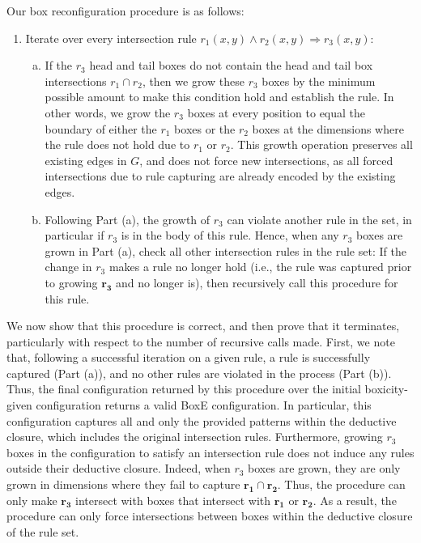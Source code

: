 \documentclass{article}
\begin{document}
Our box reconfiguration procedure is as follows:
\begin{enumerate}
    \item Iterate over every intersection rule $r_1(x,y) \land r_2(x,y) \Rightarrow r_3(x,y)$:
    \begin{enumerate}[(a)]
    \item If the $r_3$ head and tail boxes do not contain the head and tail box intersections $r_1 \cap r_2$, then we grow these $r_3$ boxes by the minimum possible amount to make this condition hold and establish the rule. In other words, we grow the $r_3$ boxes at every position to equal the boundary of either the $r_1$ boxes or the $r_2$ boxes at the dimensions where the rule does not hold due to $r_1$ or $r_2$. This growth operation preserves all existing edges in $G$, and does not force new intersections, as all forced intersections due to rule capturing are already encoded by the existing edges.
    
    \item Following Part (a), the growth of $r_3$ can violate another rule in the set, in particular if $r_3$ is in the body of this rule. Hence, when any $r_3$ boxes are grown in Part (a), check all other intersection rules in the rule set: If the change in $r_3$ makes a rule no longer hold (i.e., the rule was captured prior to growing $\bm{r_3}$ and no longer is), then recursively call this procedure for this rule.
    \end{enumerate}

\end{enumerate}

We now show that this procedure is correct, and then prove that it terminates, particularly with respect to the number of recursive calls made. First, we note that, following a successful iteration on a given rule, a rule is successfully captured (Part (a)), and no other rules are violated in the process (Part (b)). Thus, the final configuration returned by this procedure over the initial boxicity-given configuration returns a valid BoxE configuration. In particular, this configuration captures all and only the provided patterns within the deductive closure, which includes the original intersection rules. Furthermore, growing $r_3$ boxes in the configuration to satisfy an intersection rule does not induce any rules outside their deductive closure. Indeed, when $r_3$ boxes are grown, they are only grown in dimensions where they fail to capture $\bm{r_1} \cap \bm{r_2}$. Thus, the procedure can only make $\bm{r_3}$ intersect with boxes that intersect with $\bm{r_1}$ or $\bm{r_2}$. As a result, the procedure can only force intersections between boxes within the deductive closure of the rule set. 
\end{document}
